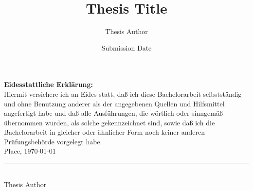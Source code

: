 \documentclass[paper=a4,%
  twoside,%
  BCOR4mm,%
  abstract=true,%
  toc=bibliography,%
  chapterprefix=true,%
  toc=bibliographynumbered,%
  open=right,%
  english,%
  pagesize=pdftex]{scrreprt}
\begin{document}
\frontmatter
\subject{\normalfont~\\[0.5cm]
  ~\\[1.5cm]
  Thesis Type in Discipline}
\title{\normalfont Thesis Title}
\author{Thesis Author}
\date{Submission Date}
\publishers{Advisor: Prof. Dr. Max Mustermann\\
  {\large (Chair for The Theory of Everything)}}
\lowertitleback{~\\
  \textbf{Thesis Author}:\\
  \emph{Thesis Title}\\
  Thesis Type, University of the World, year.
}
\maketitle

\begin{abstract}
  \blindtext
\end{abstract}
\cleardoublepage
\tableofcontents

\mainmatter%

\blinddocument

\backmatter%
\appendix
\cleardoublepage
\thispagestyle{empty}
\null\vfill
\noindent\textbf{Eidesstattliche Erklärung:}\\[1.5ex]
Hiermit versichere ich an Eides statt, daß ich diese Bachelorarbeit
selbstständig und ohne Benutzung anderer als der angegebenen Quellen und
Hilfsmittel angefertigt habe und daß alle Ausführungen, die wörtlich oder
sinngemäß übernommen wurden, als solche gekennzeichnet sind, sowie daß ich die
Bachelorarbeit in gleicher oder ähnlicher Form noch keiner anderen
Prüfungsbehörde vorgelegt habe.\\[1.5cm]
Place, \today\quad\rule{6cm}{0.1mm}\\
\null\hspace{5cm} {\small Thesis Author}
\end{document}
